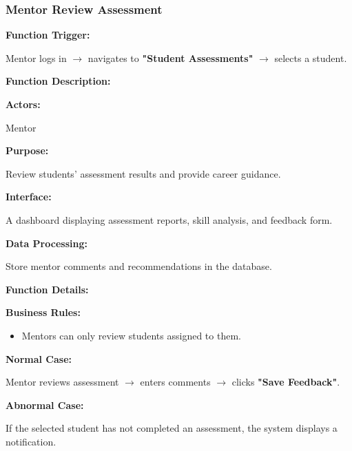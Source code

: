\subsubsection{Mentor Review Assessment}

\textbf{Function Trigger:}

Mentor logs in $\rightarrow$ navigates to \textbf{"Student Assessments"} $\rightarrow$ selects a student.

\vspace{0.3cm}

\textbf{Function Description:}

\textbf{Actors:}

Mentor

\vspace{0.2cm}

\textbf{Purpose:}

Review students' assessment results and provide career guidance.

\vspace{0.2cm}

\textbf{Interface:}

A dashboard displaying assessment reports, skill analysis, and feedback form.

\vspace{0.2cm}

\textbf{Data Processing:}

Store mentor comments and recommendations in the database.

\vspace{0.3cm}

\textbf{Function Details:}

\textbf{Business Rules:}

\begin{itemize}
\item Mentors can only review students assigned to them.
\end{itemize}

\textbf{Normal Case:}

Mentor reviews assessment $\rightarrow$ enters comments $\rightarrow$ clicks \textbf{"Save Feedback"}.

\textbf{Abnormal Case:}

If the selected student has not completed an assessment, the system displays a notification.

%

